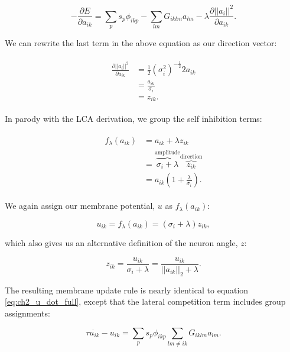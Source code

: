 \begin{equation}\label{eq:ch3_subspace_deda}
    -\frac{\partial E}{\partial a_{ik}} = \sum_{p}s_{p}\phi_{ikp} - \sum_{lm}G_{iklm}a_{lm} - \lambda \frac{\partial ||a_{i}||^{2}}{\partial a_{ik}}.
\end{equation}

We can rewrite the last term in the above equation as our direction vector:

\begin{align}\label{eq:ch3_subspace_deda_to_z}
\begin{split}
    \frac{\partial ||a_{i}||^{2}}{\partial a_{ik}} &= \frac{1}{2}\left(\sigma_{i}^{2}\right)^{-\tfrac{1}{2}}2a_{ik}\\
    &= \frac{a_{ik}}{\sigma_{i}}\\
    &= z_{ik}.
\end{split}
\end{align}

In parody with the LCA derivation, we group the self inhibition terms:

\begin{align}\label{eq:ch3_f_of_a}
\begin{split}
    f_{\lambda}(a_{ik}) &= a_{ik} + \lambda z_{ik}\\
    &= \overbrace{\sigma_{i}+\lambda}^\text{amplitude}\overbrace{z_{ik}}^\text{direction}\\
    &= a_{ik}(1 + \frac{\lambda}{\sigma_{i}}).
\end{split}
\end{align}

We again assign our membrane potential, $u$ as $f_{\lambda}(a_{ik})$:

\begin{equation}\label{eq:ch3_u_def}
  u_{ik} = f_{\lambda}(a_{ik}) = (\sigma_{i} + \lambda)z_{ik},
\end{equation}

which also gives us an alternative definition of the neuron angle, $z$:

\begin{equation}\label{eq:ch3_z_u_def}
   z_{ik} = \frac{u_{ik}}{\sigma_{i} + \lambda} = \frac{u_{ik}}{||a_{ik}||_{2} + \lambda}.
\end{equation}

The resulting membrane update rule is nearly identical to equation \ref{eq:ch2_u_dot_full}, except that the lateral competition term includes group assignments:

\begin{equation}\label{eq:ch3_subspace_u_dot_def}
   \tau \dot{u_{ik}} - u_{ik} = \sum_{p}s_{p}\phi_{ikp} \sum_{lm \ne ik}G_{iklm}a_{lm}.
\end{equation}


